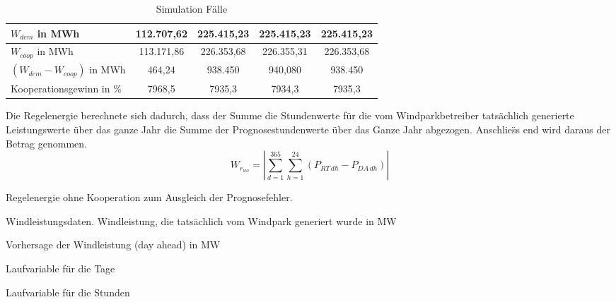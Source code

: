 \begin{table}
{\begin{tabularx}{\textwidth}{X|X|X|X|X|X|X|X|X|}
\hline
\hline
\multicolumn{1}{|l|}{$W_{dem}$ in MWh } & \multicolumn{2}{c|}{112.707,62} &
\multicolumn{2}{c|}{225.415,23} &
\multicolumn{2}{c|}{225.415,23} &
\multicolumn{2}{c|}{225.415,23}\\
\hline
\multicolumn{1}{|l|}{$W_{coop}$ in MWh} & \multicolumn{2}{c|}{113.171,86} &
\multicolumn{2}{c|}{226.353,68} &
\multicolumn{2}{c|}{226.355,31} &
\multicolumn{2}{c|}{226.353,68}\\
\hline
\multicolumn{1}{|l|}{$(W_{dem} - W_{coop})$ in MWh} & \multicolumn{2}{c|}{464,24} &
\multicolumn{2}{c|}{938.450} &
\multicolumn{2}{c|}{940,080} &
\multicolumn{2}{c|}{938.450}\\
\hline
\hline
\multicolumn{1}{|l|}{Kooperationsgewinn in \%} & \multicolumn{2}{c|}{7968,5} &
\multicolumn{2}{c|}{7935,3} &
\multicolumn{2}{c|}{7934,3} &
\multicolumn{2}{c|}{7935,3}\\
\hline


\end{tabularx}
}
\caption{Simulation F\"alle}
\label{t:faelle}
\end{table}

Die Regelenergie berechnete sich dadurch, dass der Summe die Stundenwerte f\"ur
die vom Windparkbetreiber tats\"achlich generierte Leistungswerte \"uber
das ganze Jahr die Summe der Prognosestundenwerte \"uber das Ganze Jahr
abgezogen. Anschlie\"ss end wird daraus der Betrag genommen.
\begin{equation}
	W_{r_{wo}} = |\sum^{365}_{d=1}\sum^{24}_{h=1}(P_{RT\,dh}-P_{DA\,dh})|
\label{eq:wrwo}
\end{equation}
\begin{description}[\dth]
\item[$W_{r_{wo}}$] Regelenergie ohne Kooperation zum Ausgleich der
Prognosefehler.
\item[$P_{RT}$] Windleistungsdaten. Windleistung, die tats\"achlich vom
Windpark generiert wurde in MW
\item[$P_{DA}$] Vorhersage der Windleistung (day ahead) in MW
\item[$d$] Laufvariable f\"ur die Tage
\item[$h$] Laufvariable f\"ur die Stunden
\end{description}

